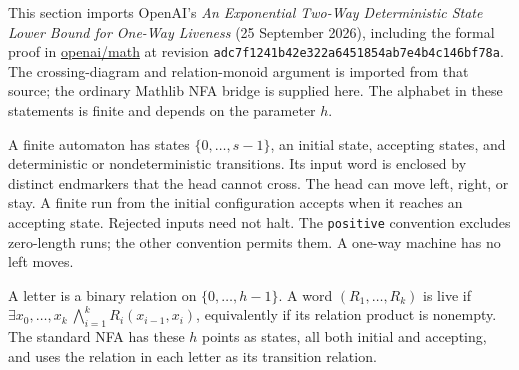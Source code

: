 This section imports OpenAI's \emph{An Exponential Two-Way Deterministic State
Lower Bound for One-Way Liveness} (25 September 2026), including the formal
proof in
\href{https://github.com/openai/math/tree/adc7f1241b42e322a6451854ab7e4b4c146bf78a/lean/OAI/Combinatorics/Automata}{openai/math}
at revision \texttt{adc7f1241b42e322a6451854ab7e4b4c146bf78a}.
The crossing-diagram and relation-monoid argument is imported from that source;
the ordinary Mathlib NFA bridge is supplied here. The alphabet in these
statements is finite and depends on the parameter $h$.

\begin{definition}
  \label{def:models-finite-automata}
  \leanok
  A finite automaton has states $\{0,\ldots,s-1\}$, an initial state,
  accepting states, and deterministic or nondeterministic transitions.
  Its input word is enclosed by distinct endmarkers that the head cannot cross.
  The head can move left, right, or stay. A finite run from the initial
  configuration accepts when it reaches an accepting state. Rejected inputs
  need not halt. The \texttt{positive} convention excludes zero-length runs;
  the other convention permits them. A one-way machine has no left moves.
\end{definition}

\begin{definition}
  \label{def:models-one-way-liveness}
  \leanok
  A letter is a binary relation on $\{0,\ldots,h-1\}$.
  A word $(R_1,\ldots,R_k)$ is live if
  $\exists x_0,\ldots,x_k\ \bigwedge_{i=1}^k R_i(x_{i-1},x_i)$,
  equivalently if its relation product is nonempty. The standard NFA has
  these $h$ points as states, all both initial and accepting, and uses the
  relation in each letter as its transition relation.
\end{definition}


